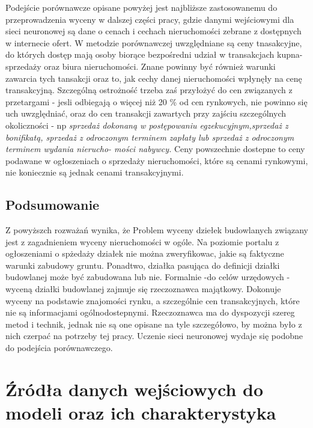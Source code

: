 \documentclass[a4paper,12pt,twoside,openany]{report}
\begin{document}
\begin{itemize}
Podejście porównawcze opisane powyżej jest najbliższe zastosowanemu do przeprowadzenia wyceny w dalszej części pracy, gdzie danymi wejściowymi dla sieci neuronowej są dane o  cenach i cechach nieruchomości zebrane z dostępnych w internecie ofert. 
W metodzie porównawczej uwzględniane są ceny tnasakcyjne, do których dostęp mają osoby biorące bezpośredni udział w transakcjach kupna-sprzedaży oraz biura nieruchomości. Znane powinny być również warunki zawarcia tych tansakcji  oraz to, jak cechy danej nieruchomości wpłynęły na cenę transakcyjną. Szczególną ostrożność trzeba zaś przyłożyć do cen związanych z przetargami - jesli odbiegają o więcej niż 20 \% od cen rynkowych, nie powinno się uch uwzględniać, oraz do cen transakcji zawartych przy zajściu szczególnych okoliczności - np \textit{sprzedaż dokonaną w postępowaniu egzekucyjnym,sprzedaż z bonifikatą, sprzedaż z odroczonym terminem zapłaty lub sprzedaż z odroczonym terminem wydania nierucho-
mości nabywcy.}
Ceny powszechnie dostepne to ceny podawane w ogłoszeniach o sprzedaży nieruchomości, które są cenami rynkowymi, nie koniecznie są jednak cenami transakcyjnymi.

\end {itemize}

\section{Podsumowanie}

Z powyższch rozważań wynika, że 
Problem wyceny dziełek budowlanych związany jest z zagadnieniem wyceny nieruchomości w ogóle. 
Na poziomie portalu z ogłoszeniami o spżedaży działek nie można zweryfikowac, jakie są faktyczne warunki zabudowy gruntu.
Ponadtwo, działka pasująca do definicji działki budowlanej może być zabudowana lub nie.
Formalnie -do celów urzędowych - wyceną działki budowlanej zajmuje się rzeczoznawca majątkowy. Dokonuje wyceny na podstawie znajomości rynku, a szczególnie cen transakcyjnych, które nie są informacjami ogólnodostepnymi. Rzeczoznawca ma do dyspozycji szereg metod i technik, jednak nie są one opisane na tyle szczegółowo, by można było z nich czerpać na potrzeby tej pracy.
Uczenie sieci neuronowej wydaje się podobne do podejścia porównawczego.




\chapter{Źródła danych wejściowych do modeli oraz ich charakterystyka}
\end{document}
